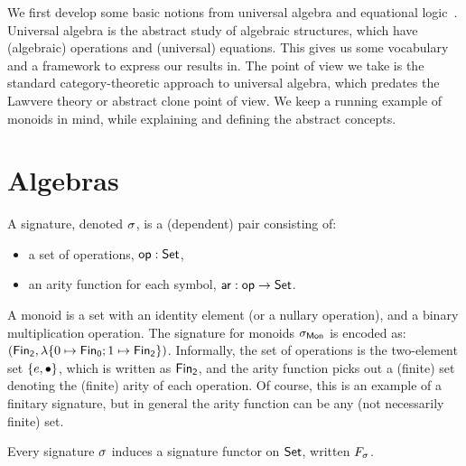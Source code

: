\label{sec:universal-algebra}

We first develop some basic notions from universal algebra and equational
logic~\cite{birkhoffStructureAbstractAlgebras1935}.
%
Universal algebra is the abstract study of algebraic structures, which have (algebraic) operations and (universal)
equations.
%
This gives us some vocabulary and a framework to express our results in.
%
The point of view we take is the standard category-theoretic approach to universal algebra, which predates the Lawvere
theory or abstract clone point of view.
%
We keep a running example of monoids in mind, while explaining and defining the abstract concepts.

\section{Algebras}
\label{sec:universal-algebra:algebras}

\begin{definition}[Signature]\label{algebra:signature}
    \label{def:signature}
    A signature, denoted $\sigma$, is a (dependent) pair consisting of:
    \begin{itemize}
        \item a set of operations, $\operatorname{\mathsf{op}} : \mathsf{Set}$,
        \item an arity function for each symbol, $\operatorname{\mathsf{ar}} : \operatorname{\mathsf{op}} \to \mathsf{Set}$.
    \end{itemize}
\end{definition}

\begin{example}
    A monoid is a set with an identity element (or a nullary operation), and a binary multiplication operation.
    The signature for monoids $\sigma_{\mathsf{Mon}}$ is encoded as:
    $(\Fin[2],\lambda \{0 \mapsto \Fin[0] ; 1 \mapsto \Fin[2] \})$.
    Informally, the set of operations is the two-element set $\{e,\mathbin{\bullet}\}$, which is written as $\Fin[2]$,
    and the arity function picks out a (finite) set denoting the (finite) arity of each operation.
    Of course, this is an example of a finitary signature,
    but in general the arity function can be any (not necessarily finite) set.
\end{example}

Every signature $\sigma$ induces a signature functor on $\mathsf{Set}$, written $\Sig$.

